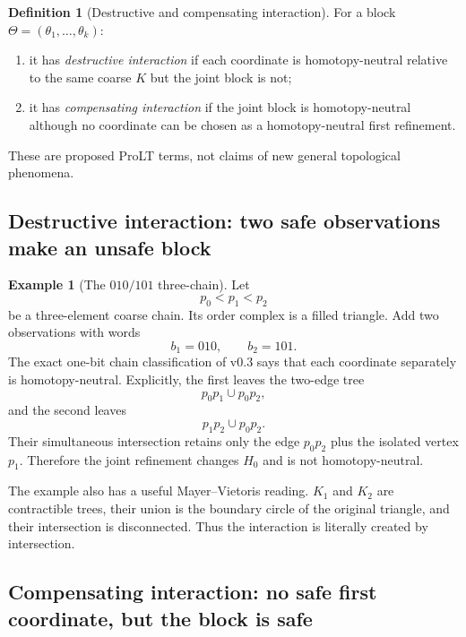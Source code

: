 \documentclass[11pt]{article}
\theoremstyle{definition}
\newtheorem{definition}[theorem]{Definition}
\newtheorem{example}[theorem]{Example}
\begin{document}
\begin{definition}[Destructive and compensating interaction]
For a block $\Theta=(\theta_1,\dots,\theta_k)$:
\begin{enumerate}[label=(\roman*)]
\item it has \emph{destructive interaction} if each coordinate is homotopy-neutral relative to the same coarse $K$ but the joint block is not;
\item it has \emph{compensating interaction} if the joint block is homotopy-neutral although no coordinate can be chosen as a homotopy-neutral first refinement.
\end{enumerate}
These are proposed ProLT terms, not claims of new general topological phenomena.
\end{definition}

\subsection{Destructive interaction: two safe observations make an unsafe block}

\begin{example}[The $010/101$ three-chain]\label{ex:destructive}
Let
\[
p_0<p_1<p_2
\]
be a three-element coarse chain. Its order complex is a filled triangle. Add two observations with words
\[
b_1=010,
\qquad
b_2=101.
\]
The exact one-bit chain classification of v0.3 says that each coordinate separately is homotopy-neutral. Explicitly, the first leaves the two-edge tree
\[
p_0p_1\cup p_0p_2,
\]
and the second leaves
\[
p_1p_2\cup p_0p_2.
\]
Their simultaneous intersection retains only the edge $p_0p_2$ plus the isolated vertex $p_1$. Therefore the joint refinement changes $H_0$ and is not homotopy-neutral.
\end{example}

The example also has a useful Mayer--Vietoris reading. $K_1$ and $K_2$ are contractible trees, their union is the boundary circle of the original triangle, and their intersection is disconnected. Thus the interaction is literally created by intersection.

\subsection{Compensating interaction: no safe first coordinate, but the block is safe}
\end{document}
